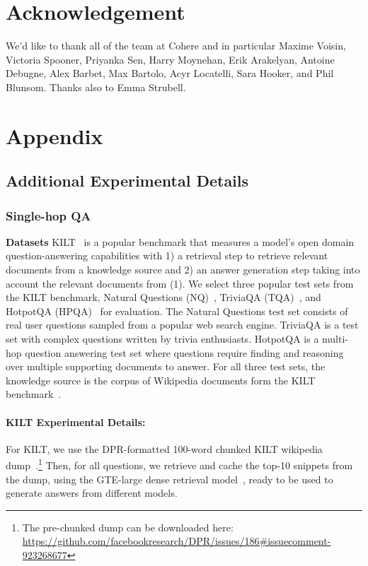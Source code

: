 \documentclass[11pt]{article}
\begin{document}
\section*{Acknowledgement}
We'd like to thank all of the team at Cohere and in particular Maxime Voisin, Victoria Spooner, Priyanka Sen, Harry Moynehan, Erik Arakelyan, Antoine Debugne, Alex Barbet, Max Bartolo, Acyr Locatelli, Sara Hooker, and Phil Blunsom. Thanks also to Emma Strubell.



\section{Appendix}
\subsection{Additional Experimental Details}
\subsubsection{Single-hop QA \label{sec:appendix_qa}}
\noindent\textbf{Datasets}
KILT~\cite{petroni2021kilt} is a popular benchmark that measures a model's open domain question-answering capabilities with 1) a retrieval step to retrieve relevant documents from a knowledge source and 2) an answer generation step taking into account the relevant documents from (1). We select three popular test sets from the KILT benchmark, Natural Questions (NQ)~\cite{kwiatkowski-etal-2019-natural}, TriviaQA (TQA)~\cite{joshi-etal-2017-triviaqa}, and HotpotQA (HPQA)~\cite{yang-etal-2018-hotpotqa} for evaluation. The Natural Questions test set consists of real user questions sampled from a popular web search engine. %
TriviaQA is a test set with complex questions written by trivia enthusiasts. %
HotpotQA is a multi-hop question answering test set where questions require finding and reasoning over multiple supporting documents to answer. 
For all three test sets, the knowledge source is the corpus of Wikipedia documents form the KILT benchmark~\cite{petroni2021kilt}.

\paragraph{KILT Experimental Details:} For KILT, we use the DPR-formatted 100-word chunked KILT wikipedia dump~\cite{Karpukhin2020DensePR,petroni2021kilt}.\footnote{The pre-chunked dump can be downloaded here: \url{https://github.com/facebookresearch/DPR/issues/186\#issuecomment-923268677}}
Then, for all questions, we retrieve and cache the top-10 snippets from the dump, using the GTE-large dense retrieval model~\citep{Wang2023ImprovingTE}, ready to be used to generate answers from different models.
\end{document}
